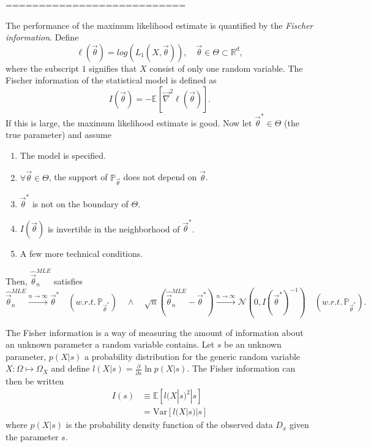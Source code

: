 ===========================


The performance of the maximum likelihood estimate is quantified by the \emph{Fischer information}. Define
\begin{equation}
	\ell(\vec{\theta})=log(L_1(X,\vec{\theta})), \quad \vec{\theta}\in\Theta\subset \mathbb{R}^d,
\end{equation}
where the subscript $1$ signifies that $X$ consist of only one random variable. The Fischer information of the statistical model is defined as
\begin{equation}
	I(\vec{\theta})=-\mathbb{E}[\vec{\nabla}^2\ell(\vec{\theta})].
\end{equation}
If this is large, the maximum likelihood estimate is good. Now let $\vec{\theta}^*\in \Theta$ (the true parameter) and assume
\begin{enumerate}
	\item The model is specified.
	\item $\forall \vec{\theta}\in \Theta$, the support of $\mathbb{P}_{\vec{\theta}}$ does not depend on $\vec{\theta}$.
	\item $\vec{\theta}^*$ is not on the boundary of $\Theta$.
	\item $I(\vec{\theta})$ is invertible in the neighborhood of $\vec{\theta}^*$.
	\item A few more technical conditions.
\end{enumerate}
Then, $\hat{\vec{\theta}}^{MLE}_n$ satisfies
\begin{equation}
	\hat{\vec{\theta}}_n^{MLE}\xrightarrow[]{n\rightarrow\infty}\vec{\theta}^* \quad (w.r.t. \, \mathbb{P}_{\vec{\theta}^*})\quad \wedge \quad \sqrt{n}(\hat{\vec{\theta}}_n^{MLE}-\vec{\theta}^*)\xrightarrow[]{n\rightarrow\infty}\mathcal{N}(0,I(\vec{\theta}^*)^{-1})\quad (w.r.t. \, \mathbb{P}_{\vec{\theta}^*}).
\end{equation}



\begin{definition}
	\label{def:fisher_information}
	The Fisher information is a way of measuring the amount of information about an unknown parameter a random variable contains. Let $s$ be an unknown parameter, $p(X|s)$ a probability distribution for the generic random variable $X:\Omega\mapsto \Omega_X$ and define $l(X|s)= \frac{\partial}{\partial s} \ln p(X|s)$. The Fisher information can then be written
	\begin{equation}
		\begin{split}
			I(s) &\equiv \mathbb{E} [l(X|s)^2|s]\\
			&= \text{Var}[l(X|s)|s]
		\end{split}
	\end{equation}
	where $p(X|s)$ is the probability density function of the observed data $D_x$ given the parameter $s$.
\end{definition}

